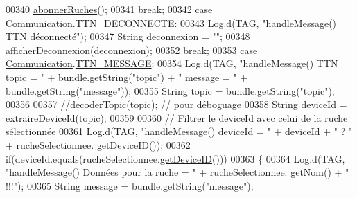 \begin{DoxyCode}
{{{00340                     \hyperlink{classcom_1_1example_1_1bee__honeyt_1_1_i_h_m_mobile_ac255143b5796de6ee0be9852d2b89396}{abonnerRuches}();
00341                     \textcolor{keywordflow}{break};
00342                 \textcolor{keywordflow}{case} \hyperlink{classcom_1_1example_1_1bee__honeyt_1_1_communication}{Communication}.\hyperlink{classcom_1_1example_1_1bee__honeyt_1_1_communication_ae2fba68d5f0ed6c8bdbaaae68a4e6192}{TTN\_DECONNECTE}:
00343                     Log.d(TAG, \textcolor{stringliteral}{"handleMessage() TTN déconnecté"});
00347                     String deconnexion = \textcolor{stringliteral}{""};
00348                     \hyperlink{classcom_1_1example_1_1bee__honeyt_1_1_i_h_m_mobile_a8eeb63d847d450223c641107e2f27f1a}{afficherDeconnexion}(deconnexion);
00352                     \textcolor{keywordflow}{break};
00353                 \textcolor{keywordflow}{case} \hyperlink{classcom_1_1example_1_1bee__honeyt_1_1_communication}{Communication}.\hyperlink{classcom_1_1example_1_1bee__honeyt_1_1_communication_aa81848662846946c92ee2b1380669c66}{TTN\_MESSAGE}:
00354                     Log.d(TAG, \textcolor{stringliteral}{"handleMessage() TTN topic = "} + bundle.getString(\textcolor{stringliteral}{"topic"}) + \textcolor{stringliteral}{" message = "} +
       bundle.getString(\textcolor{stringliteral}{"message"}));
00355                     String topic = bundle.getString(\textcolor{stringliteral}{"topic"});
00356 
00357                     \textcolor{comment}{//decoderTopic(topic); // pour déboguage}
00358                     String deviceId = \hyperlink{classcom_1_1example_1_1bee__honeyt_1_1_i_h_m_mobile_ab957cc8fd25c104c48341f7e4141e173}{extraireDeviceId}(topic);
00359 
00360                     \textcolor{comment}{// Filtrer le deviceId avec celui de la ruche sélectionnée}
00361                     Log.d(TAG, \textcolor{stringliteral}{"handleMessage() deviceId = "} + deviceId + \textcolor{stringliteral}{" ? "} + rucheSelectionnee.
      \hyperlink{classcom_1_1example_1_1bee__honeyt_1_1_ruche_a4960ba8542f507c850978b939b9aa9e5}{getDeviceID}());
00362                     \textcolor{keywordflow}{if}(deviceId.equals(rucheSelectionnee.\hyperlink{classcom_1_1example_1_1bee__honeyt_1_1_ruche_a4960ba8542f507c850978b939b9aa9e5}{getDeviceID}()))
00363                     \{
00364                         Log.d(TAG, \textcolor{stringliteral}{"handleMessage() Données pour la ruche = "} + rucheSelectionnee.
      \hyperlink{classcom_1_1example_1_1bee__honeyt_1_1_ruche_a940047f0b4b8218e7faa7eafcc9665b2}{getNom}() + \textcolor{stringliteral}{" !!!"});
00365                         String message = bundle.getString(\textcolor{stringliteral}{"message"});
}}}
\end{DoxyCode}
